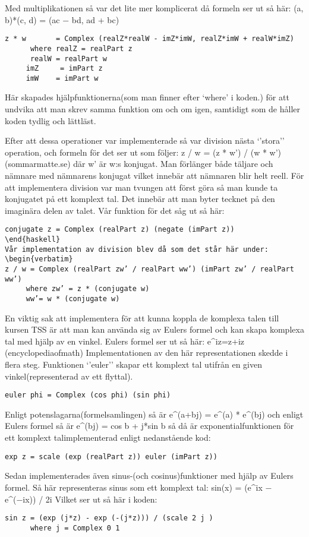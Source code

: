 \documentclass[]{article}
\begin{document}
Med multiplikationen så var det lite mer komplicerat då formeln ser ut så här:
 (a, b)*(c, d) = (ac − bd, ad + bc) 

\begin{verbatim}
z * w       = Complex (realZ*realW - imZ*imW, realZ*imW + realW*imZ)
      where realZ = realPart z
      realW = realPart w
     imZ     = imPart z
     imW    = imPart w
\end{verbatim}

Här skapades hjälpfunktionerna(som man finner efter ‘where’ i koden.) för att undvika att man skrev samma funktion om och om igen, samtidigt som de håller koden tydlig och lättläst.

Efter att dessa operationer var implementerade så var division nästa ‘’stora’’ operation, och formeln för det ser ut som följer:
z / w = (z * w’) / (w * w’) (sommarmatte.se)  där w’ är w:s konjugat. 
Man förlänger både täljare och nämnare med nämnarens konjugat vilket innebär att nämnaren blir helt reell. 
För att implementera division var man tvungen att först göra så man kunde ta konjugatet på ett komplext tal. Det innebär att man byter tecknet på den imaginära delen av talet. 
Vår funktion för det såg ut så här:
\begin{verbatim}
conjugate z = Complex (realPart z) (negate (imPart z))
\end{haskell}
Vår implementation av division blev då som det står här under:
\begin{verbatim}
z / w = Complex (realPart zw’ / realPart ww’) (imPart zw’ / realPart ww’)
     where zw’ = z * (conjugate w)
     ww’= w * (conjugate w)
\end{verbatim}

En viktig sak att implementera för att kunna koppla de komplexa talen till kursen TSS är att man kan använda sig av Eulers formel och kan skapa komplexa tal med hjälp av en vinkel. 
Eulers formel ser ut så här:
e^{iz}=\cos z+i\sin z (encyclopediaofmath)
Implementationen av den här representationen skedde i flera steg. Funktionen ‘’euler’’ skapar ett komplext tal utifrån en given vinkel(representerad av ett flyttal). 
\begin{verbatim}
euler phi = Complex (cos phi) (sin phi)
\end{verbatim}
Enligt potenslagarna(formelsamlingen) så är e^(a+bj) = e^(a) * e^(bj) och enligt Eulers formel så är e^(bj) = cos b + j*sin b så då är exponentialfunktionen för ett komplext talimplementerad enligt nedanstående kod:
\begin{verbatim}
exp z = scale (exp (realPart z)) euler (imPart z))
\end{verbatim}
Sedan implementerades även sinus-(och cosinus)funktioner med hjälp av Eulers formel. Så här representeras sinus som ett komplext tal:
sin(x) = (e^ix − e^(−ix)) / 2i
Vilket ser ut så här i koden:
\begin{verbatim}
sin z = (exp (j*z) - exp (-(j*z))) / (scale 2 j )
      where j = Complex 0 1
\end{verbatim}
\end{document}

